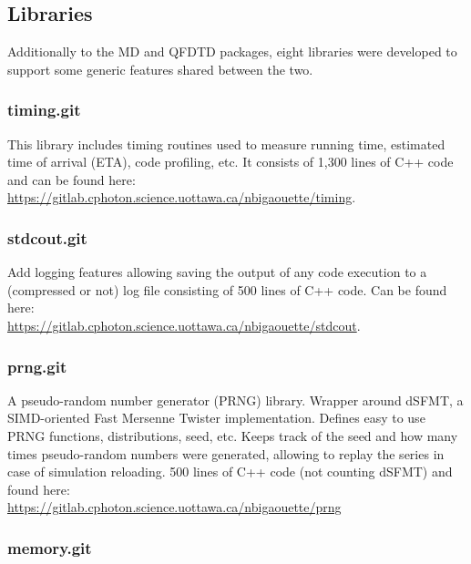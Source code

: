 \subsection{Libraries}
\label{section:tools:libraries}

Additionally to the MD and QFDTD packages, eight libraries were developed to
support some generic features shared between the two.

\subsubsection{timing.git} \label{section:tools:libraries:timing}

This library includes timing routines used to measure running time, estimated
time of arrival (ETA), code profiling, etc. It consists of 1,300 lines of C++
code and can be found here:
\url{https://gitlab.cphoton.science.uottawa.ca/nbigaouette/timing}.


\subsubsection{stdcout.git} \label{section:tools:libraries:stdcout}

Add logging features allowing saving the output of any code execution to a
(compressed or not) log file consisting of 500 lines of C++ code.
Can be found here:\\
\url{https://gitlab.cphoton.science.uottawa.ca/nbigaouette/stdcout}.


\subsubsection{prng.git} \label{section:tools:libraries:prng}

A pseudo-random number generator (PRNG) library. Wrapper around
dSFMT\cite{prng2009}, a SIMD-oriented Fast Mersenne Twister implementation.
Defines easy to use PRNG functions, distributions, seed, etc. Keeps track of
the seed and how many times pseudo-random numbers were generated, allowing
to replay the series in case of simulation reloading. 500 lines of C++ code
(not counting dSFMT) and found here:\\
\url{https://gitlab.cphoton.science.uottawa.ca/nbigaouette/prng}


\subsubsection{memory.git} \label{section:tools:libraries:memory}

